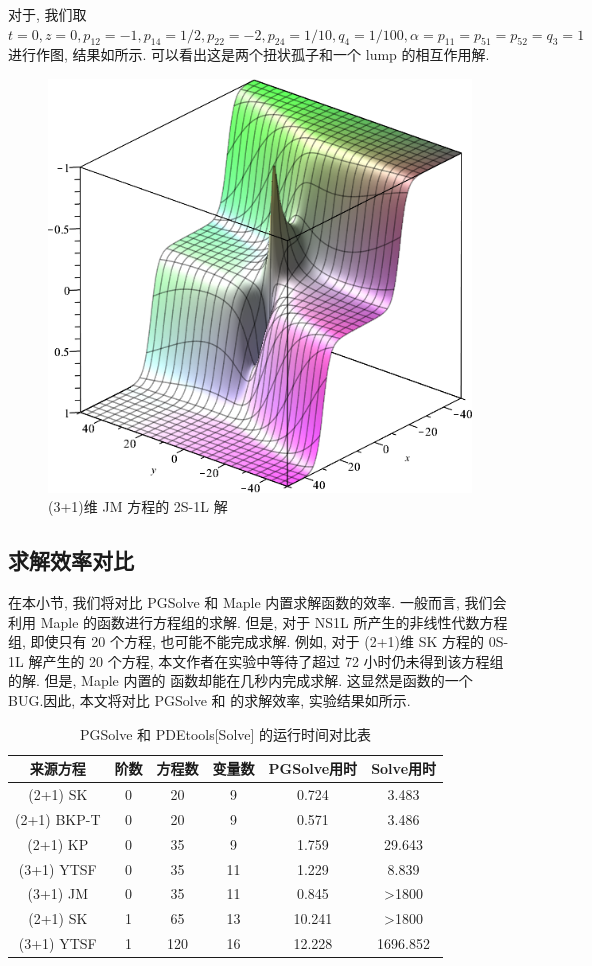 对于, 我们取 $t=0,z=0,p_{12}=-1,p_{14}=1/2,p_{22}=-2,p_{24}=1/10,q_4=1/100,\alpha=p_{11}=p_{51}=p_{52}=q_3=1$进行作图, 结果如所示. 可以看出这是两个扭状孤子和一个 lump 的相互作用解.

\begin{figure}[htbp]
\centering
\includegraphics[width=.6\textwidth]{fig/2S1L.png}
\caption{(3+1)维 JM 方程的 2S-1L 解} \label{fig-2S1L}
\end{figure}

\subsection{求解效率对比}

在本小节, 我们将对比 PGSolve 和 Maple 内置求解函数的效率. 一般而言, 我们会利用 Maple 的函数进行方程组的求解. 但是, 对于 NS1L 所产生的非线性代数方程组, 即使只有 20 个方程, 也可能不能完成求解. 例如, 对于 (2+1)维 SK 方程的 0S-1L 解产生的 20 个方程, 本文作者在实验中等待了超过 72 小时仍未得到该方程组的解. 但是, Maple 内置的  函数却能在几秒内完成求解. 这显然是函数的一个 BUG.因此, 本文将对比 PGSolve 和  的求解效率, 实验结果如所示. 

\begin{table}[htbp]
\centering
\caption{PGSolve 和 PDEtools[Solve] 的运行时间对比表} \label{NS1L-cmp}
\begin{tabular}{cccccc}
\hline
来源方程 & 阶数 & 方程数 & 变量数 & PGSolve用时 & Solve用时 \\
\hline
(2+1) SK & 0 & 20 & 9 & 0.724 & 3.483 \\
(2+1) BKP-T & 0 & 20 & 9 & 0.571 & 3.486 \\
(2+1) KP & 0 & 35 & 9 & 1.759 & 29.643 \\
(3+1) YTSF & 0 & 35 & 11 & 1.229 & 8.839 \\
(3+1) JM & 0 & 35 & 11 & 0.845 & >1800 \\
(2+1) SK & 1 & 65 & 13 & 10.241 & >1800 \\
(3+1) YTSF & 1 & 120 & 16 & 12.228 & 1696.852 \\
\hline
\end{tabular}
\end{table}

